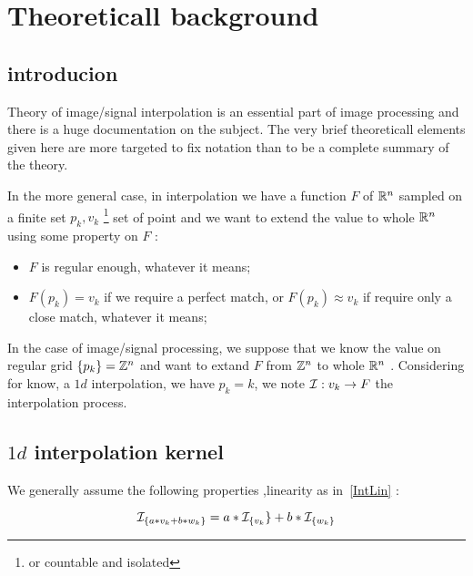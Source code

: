 
\section{Theoreticall background}

\subsection{introducion}

Theory of image/signal interpolation is an essential  part of image processing and there is a huge 
documentation on the subject. The very brief theoreticall elements given here are more targeted to fix notation
than to be a complete summary of the theory.

In the more general case, in interpolation we have a function $F$  of $\mathbb{R}^n$ sampled on a finite  set $p_k,v_k$
\footnote{or countable and isolated} set of point and we want to extend the value to whole
$\mathbb{R}^n$  using some  property on $F$ :

\begin{itemize}
   \item $F$ is regular enough, whatever it means;
   \item $F(p_k) = v_k$ if we require a perfect match, or $F(p_k) \approx v_k$  if require only a close
         match,  whatever it means;
\end{itemize}



In the case of image/signal processing, we suppose that we know the value on regular grid $\{p_k\}=\mathbb{Z}^n$
and want to extand $F$ from $\mathbb{Z}^n$ to whole $\mathbb{R}^n$ . 
Considering for know, a $1d$ interpolation, we have $p_k=k$, we note $\mathcal I :  {v_k}  \rightarrow F$ 
the interpolation process.  


\subsection{$1d$ interpolation kernel}

We generally assume the following properties ,linearity as in~\ref{IntLin} :

\begin{equation}
    \mathcal I_{\{a*v_k+b*w_k\}} = a*\mathcal I_{\{v_k}\}+ b*\mathcal I_{\{w_k\}} \label{IntLin}
\end{equation}


